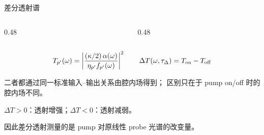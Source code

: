 \begin{frame}{差分透射谱}

  \footnotesize
  \setlength{\abovedisplayskip}{2pt}
  \setlength{\belowdisplayskip}{2pt}

  \begin{columns}[c,onlytextwidth]
    \begin{column}{0.48\textwidth}
      {\centering\fboxsep=5pt\fboxrule=0.4pt
      \par}
    \end{column}
    \begin{column}{0.48\textwidth}
      {\centering\fboxsep=5pt\fboxrule=0.4pt
      \par}
    \end{column}
  \end{columns}

  \vspace{0.3em}

  \[
    T_{p'}(\omega)
    =\left|
      \frac{(\kappa/2)\,\alpha(\omega)}{\eta_{p'}f_{p'}(\omega)}
    \right|^2
    \qquad
    \Delta T(\omega,\tau_\Delta)
    =T_{\rm on}-T_{\rm off}
  \]
  {\centering\scriptsize\color{gray}
    二者都通过同一标准输入--输出关系由腔内场得到；
    区别只在于 pump on/off 时的腔内场不同。\par}

  \vspace{0.2em}

  {\centering\scriptsize
    $\Delta T>0$：透射增强；\qquad $\Delta T<0$：透射减弱。\par
    因此差分透射测量的是 pump 对原线性 probe 光谱的改变量。\par}


\end{frame}
